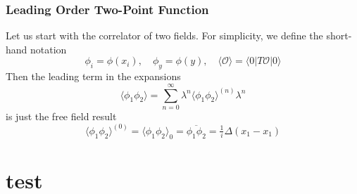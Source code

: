 \documentclass[12pt]{article}
\begin{document}
\subsubsection{Leading Order Two-Point Function}

Let us start with the correlator of two fields. For simplicity, we
define the short-hand notation
\begin{equation}
  \phi_i = \phi(x_i)
  ,\quad
  \phi_y = \phi(y)
  ,\quad
  \langle \mathcal{O} \rangle = \langle 0|T \mathcal{O} |0\rangle
\end{equation}
Then the leading term in the expansions
\begin{equation}
  \langle \phi_1 \phi_2 \rangle = 
  \sum_{n=0}^\infty \lambda^n \langle \phi_1 \phi_2 \rangle^{(n)}
  \lambda^n
\end{equation}
is just the free field result
\begin{equation}
  \langle \phi_1 \phi_2 \rangle^{(0)}
  = 
  \langle \phi_1 \phi_2 \rangle_0
  = 
  \overline{\phi_1 \phi_2}
  = 
  \tfrac{1}{i} \Delta(x_1 - x_1)
\end{equation}





\newpage
\appendix

\section{test}



 
\renewcommand{\refname}{Bibliography}

\end{document}
